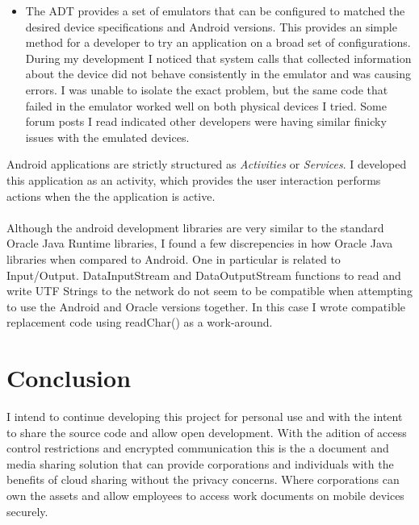 \documentclass[12pt]{article}
\begin{document}
\begin{itemize}
\item The ADT provides a set of emulators that can be configured to matched the desired device specifications and Android versions. This provides an simple method for a developer to try an application on a broad set of configurations. During my development I noticed that system calls that collected information about the device did not behave consistently in the emulator and was causing errors. I was unable to isolate the exact problem, but the same code that failed in the emulator worked well on both physical devices I tried.  Some forum posts I read indicated other developers were having similar finicky issues with the emulated devices.

\end{itemize}

Android applications are strictly structured as \emph{Activities} or \emph{Services}. I developed this application as an activity, which provides the user interaction performs actions when the the application is active.\\
\\
Although the android development libraries are very similar to the standard Oracle Java Runtime libraries, I found a few discrepencies in how Oracle Java libraries when compared to Android. One in particular is related to Input/Output. DataInputStream and DataOutputStream functions to read and write UTF Strings to the network do not seem to be compatible when attempting to use the Android and Oracle versions together. In this case I wrote compatible replacement code using readChar() as a work-around.\\

\section{Conclusion}

I intend to continue developing this project for personal use and with the intent to share the source code and allow open development. With the adition of access control restrictions and encrypted communication this is the a document and media sharing solution that can provide corporations and individuals with the benefits of cloud sharing without the privacy concerns. Where corporations can own the assets and allow employees to access work documents on mobile devices securely.  
\end{document}
